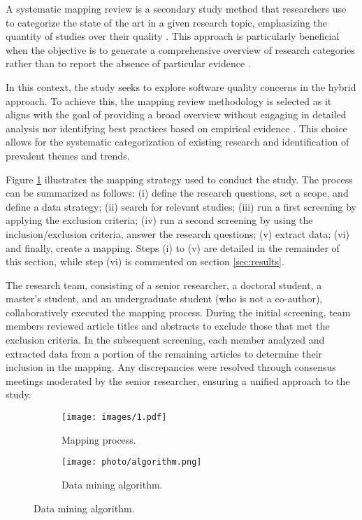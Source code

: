 A systematic mapping review is a secondary study method that researchers use to categorize the state of the art in a given research topic, emphasizing the quantity of studies over their quality \cite{Petersen2008}. This approach is particularly beneficial when the objective is to generate a comprehensive overview of research categories rather than to report the absence of particular evidence \cite{Salama2017}.

In this context, the study seeks to explore software quality concerns in the hybrid approach. To achieve this, the mapping review methodology is selected as it aligns with the goal of providing a broad overview without engaging in detailed analysis nor identifying best practices based on empirical evidence \cite{Petersen2008}. This choice allows for the systematic categorization of existing research and identification of prevalent themes and trends.

Figure \ref{mapping_process} illustrates the mapping strategy used to conduct the study. The process can be summarized as follows: (i) define the research questions, set a scope, and define a data strategy; (ii) search for relevant studies; (iii) run a first screening by applying the exclusion criteria; (iv) run a second screening by using the inclusion/exclusion criteria, answer the research questions; (v) extract data; (vi) and finally, create a mapping. Steps (i) to (v) are detailed in the remainder of this section, while step (vi) is commented on section \ref{sec:results}.

The research team, consisting of a senior researcher, a doctoral student, a master’s student, and an undergraduate student (who is not a co-author), collaboratively executed the mapping process. During the initial screening, team members reviewed article titles and abstracts to exclude those that met the exclusion criteria. In the subsequent screening, each member analyzed and extracted data from a portion of the remaining articles to determine their inclusion in the mapping. Any discrepancies were resolved through consensus meetings moderated by the senior researcher, ensuring a unified approach to the study.

\begin{figure}[htbp]
  \begin{center}
    \begin{subfigure}[b]{0.48\textwidth}
      \centering
      \texttt{[image: images/1.pdf]}
      \caption{Mapping process.}
      \label{mapping_process}
    \end{subfigure}
    \hfill
    \begin{subfigure}[b]{0.48\textwidth}
      \centering
      \texttt{[image: photo/algorithm.png]}
      \caption{Data mining algorithm.}
      \label{algorithm}
    \end{subfigure}
  \end{center}
\end{figure}

